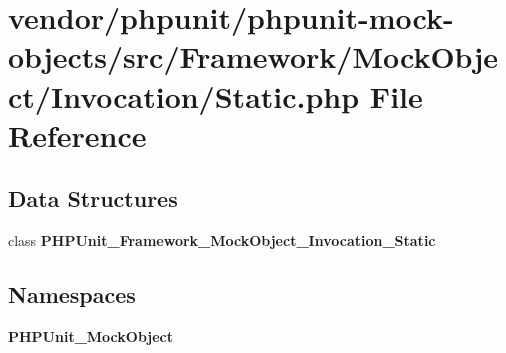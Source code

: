 \section{vendor/phpunit/phpunit-\/mock-\/objects/src/\+Framework/\+Mock\+Object/\+Invocation/\+Static.php File Reference}
\label{_static_8php}
\subsection*{Data Structures}
\begin{DoxyCompactItemize}
\item 
class {\bf P\+H\+P\+Unit\+\_\+\+Framework\+\_\+\+Mock\+Object\+\_\+\+Invocation\+\_\+\+Static}
\end{DoxyCompactItemize}
\subsection*{Namespaces}
\begin{DoxyCompactItemize}
\item 
 {\bf P\+H\+P\+Unit\+\_\+\+Mock\+Object}
\end{DoxyCompactItemize}
